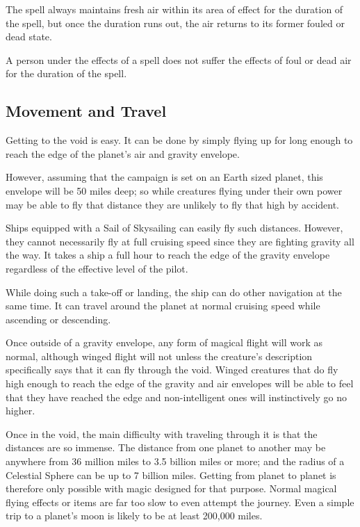 \begin{multicols*}{2}

The  spell always maintains fresh air within its area of effect for the duration of the spell, but once the duration runs out, the air returns to its former fouled or dead state.

A person under the effects of a  spell does not suffer the effects of foul or dead air for the duration of the spell.

\subsection{Movement and Travel}
Getting to the void is easy. It can be done by simply flying up for long enough to reach the edge of the planet’s air and gravity envelope.

However, assuming that the campaign is set on an Earth sized planet, this envelope will be 50 miles deep; so while creatures flying under their own power may be able to fly that distance they are unlikely to fly that high by accident.

Ships equipped with a Sail of Skysailing can easily fly such distances. However, they cannot necessarily fly at full cruising speed since they are fighting gravity all the way. It takes a ship a full hour to reach the edge of the gravity envelope regardless of the effective level of the pilot.

While doing such a take-off or landing, the ship can do other navigation at the same time. It can travel around the planet at normal cruising speed while ascending or descending.

Once outside of a gravity envelope, any form of magical flight will work as normal, although winged flight will not unless the creature’s description specifically says that it can fly through the void. Winged creatures that do fly high enough to reach the edge of the gravity and air envelopes will be able to feel that they have reached the edge and non-intelligent ones will instinctively go no higher.

Once in the void, the main difficulty with traveling through it is that the distances are so immense. The distance from one planet to another may be anywhere from 36 million miles to 3.5 billion miles or more; and the radius of a Celestial Sphere can be up to 7 billion miles. Getting from planet to planet is therefore only possible with magic designed for that purpose. Normal magical flying effects or items are far too slow to even attempt the journey. Even a simple trip to a planet’s moon is likely to be at least 200,000 miles.


\end{multicols*}
